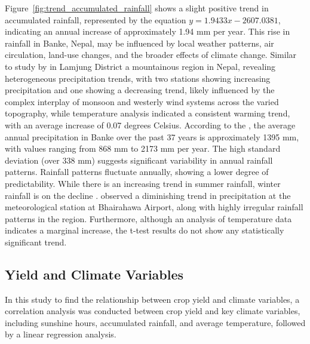 Figure~\ref{fig:trend_accumulated_rainfall} shows a slight positive trend in accumulated rainfall, represented by the equation $y=1.9433x - 2607.0381$, indicating an annual increase of approximately 1.94 mm per year. This rise in rainfall in Banke, Nepal, may be influenced by local weather patterns, air circulation, land-use changes, and the broader effects of climate change. Similar to study by \textcite{poudelRelationshipsClimateVariability2016} in Lamjung District a mountainous region in Nepal, revealing heterogeneous precipitation trends, with two stations showing increasing precipitation and one showing a decreasing trend, likely influenced by the complex interplay of monsoon and westerly wind systems across the varied topography, while temperature analysis indicated a consistent warming trend, with an average increase of 0.07 degrees Celsius.
According to the \textcite{regmiCROPYIELDRESPONSE2019}, the average annual precipitation in Banke over the past 37 years is approximately 1395 mm, with values ranging from 868 mm to 2173 mm per year. The high standard deviation (over 338 mm) suggests significant variability in annual rainfall patterns. 
Rainfall patterns fluctuate annually, showing a lower degree of predictability. While there is an increasing trend in summer rainfall, winter rainfall is on the decline \parencite{maharjanEffectClimateVariables2013}.
\textcite{manandharAdaptingCroppingSystems2011} observed a diminishing trend in precipitation at the meteorological station at Bhairahawa Airport, along with highly irregular rainfall patterns in the region. Furthermore, although an analysis of temperature data indicates a marginal increase, the t-test results do not show any statistically significant trend.

\subsection{Yield and Climate Variables}
In this study to find the relationship between crop yield and climate variables, a correlation analysis was conducted between crop yield and key climate variables, including sunshine hours, accumulated rainfall, and average temperature, followed by a linear regression analysis.

\begin{table}[htbp]
    \centering
    \caption{Correlation Table between Yield and Climate Variables}
\end{table}

